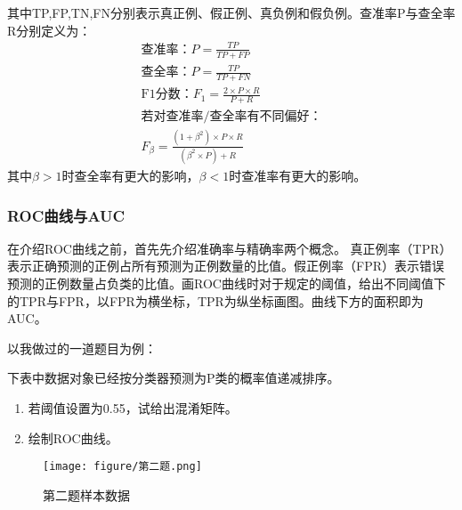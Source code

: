 \documentclass[twoside]{article}
\begin{document}
    其中TP,FP,TN,FN分别表示真正例、假正例、真负例和假负例。查准率P与查全率R分别定义为：
    \begin{equation*}
        \begin{aligned}
            \text{查准率：}P=\frac{TP}{TP+FP}\\
            \text{查全率：}P=\frac{TP}{TP+FN}\\
            \text{F1分数：}F_1=\frac{2\times P\times R}{P+R}\\
            \text{若对查准率/查全率有不同偏好：}\\
            F_{\beta}=\frac{(1+\beta^2)\times P\times R}{(\beta^2 \times P)+R}
        \end{aligned}
    \end{equation*}
    其中$\beta >1$时查全率有更大的影响，$\beta <1$时查准率有更大的影响。
\subsubsection*{ROC曲线与AUC}
在介绍ROC曲线之前，首先先介绍准确率与精确率两个概念。
真正例率（TPR）表示正确预测的正例占所有预测为正例数量的比值。假正例率（FPR）表示错误预测的正例数量占负类的比值。画ROC曲线时对于规定的阈值，给出不同阈值下的TPR与FPR，以FPR为横坐标，TPR为纵坐标画图。曲线下方的面积即为AUC。

以我做过的一道题目为例：

下表中数据对象已经按分类器预测为P类的概率值递减排序。
\begin{enumerate}
    \item 若阈值设置为0.55，试给出混淆矩阵。
    \item 绘制ROC曲线。
\end{enumerate}
\begin{figure}[h]
    \centering
    \texttt{[image: figure/第二题.png]}
    \caption{第二题样本数据}
\end{figure}
\end{document}
